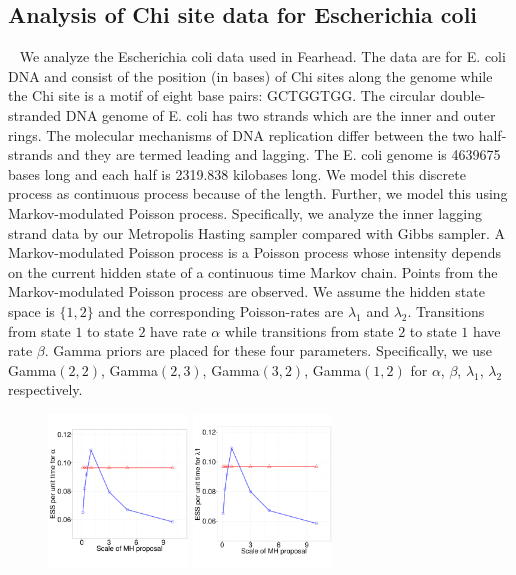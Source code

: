 {  \subsection{Analysis of Chi site data for Escherichia coli}~
  We analyze the Escherichia coli data used in Fearhead. The data are for E. coli DNA and consist of the position (in bases) of Chi sites along the genome while the Chi site is a motif of eight base pairs: GCTGGTGG. The circular double-stranded DNA genome of E. coli has two strands which are the inner and outer rings. The molecular mechanisms of DNA replication differ between the two half-strands and they are termed leading and lagging. The E. coli genome is 4639675 bases long and each half is 2319.838 kilobases long. We model this discrete process as continuous process because of the length. Further, we model this using Markov-modulated Poisson process. Specifically, we analyze the inner lagging strand data by our Metropolis Hasting sampler compared with Gibbs sampler. A Markov-modulated Poisson process is a Poisson process whose intensity depends on the current hidden state of a continuous time Markov chain. Points from the Markov-modulated Poisson process are observed. We assume the hidden state space is  $\{1, 2\}$ and the corresponding Poisson-rates are $\lambda_1$ and $\lambda_2$. Transitions from state $1$ to state $2$ have rate $\alpha$ while transitions from state $2$ to state $1$ have rate $\beta$. Gamma priors are placed for these four parameters. Specifically, we use Gamma$(2,2)$, Gamma$(2,3)$, Gamma$(3,2)$, Gamma$(1,2)$ for $\alpha$, $\beta$, $\lambda_1$, $\lambda_2$ respectively.
  \begin{figure}%
  \centering
  \begin{minipage}[!hp]{0.99\linewidth}
  \centering
    \includegraphics [width=0.33\textwidth, angle=0]{figures_new_apr12/ecoli_alpha_18apr12.pdf}
    \includegraphics [width=0.33\textwidth, angle=0]{figures_new_apr12/ecoli_l1_18apr12.pdf}

\end{minipage}
\end{figure}}
